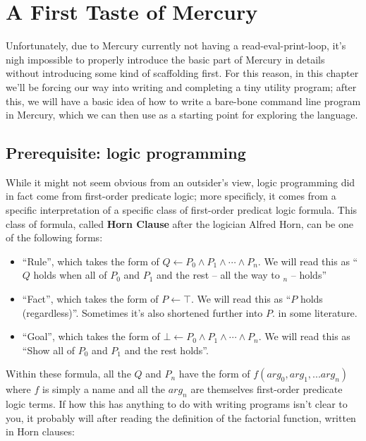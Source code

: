 \chapter{A First Taste of Mercury}

Unfortunately, due to Mercury currently not having a read-eval-print-loop, it's nigh impossible to properly introduce the basic part of Mercury in details without introducing some kind of scaffolding first. For this reason, in this chapter we'll be forcing our way into writing and completing a tiny utility program; after this, we will have a basic idea of how to write a bare-bone command line program in Mercury, which we can then use as a starting point for exploring the language.

\section{Prerequisite: logic programming}
\label{sec:org7970573}

While it might not seem obvious from an outsider's view, logic programming did in fact come from first-order predicate logic; more specificly, it comes from a specific interpretation of a specific class of first-order predicat logic formula. This class of formula, called \textbf{Horn Clause} after the logician Alfred Horn, can be one of the following forms:

\begin{itemize}
	\item ``Rule'', which takes the form of \(Q \leftarrow P_0 \wedge P_1 \wedge \cdots \wedge P_n\). We will read this as ``$Q$ holds when all of $P_0$ and $P_1$ and the rest -- all the way to $_n$ -- holds''
	\item ``Fact'', which takes the form of \(P \leftarrow \top\). We will read this as ``$P$ holds (regardless)''. Sometimes it's also shortened further into $P.$ in some literature.
	\item ``Goal'', which takes the form of \(\bot \leftarrow P_0 \wedge P_1 \wedge \cdots \wedge P_n\). We will read this as ``Show all of $P_0$ and $P_1$ and the rest holds''.
\end{itemize}

Within these formula, all the \(Q\) and \(P_n\) have the form of $f(arg_0, arg_1, ... arg_n)$ where $f$ is simply a name and all the $arg_n$ are themselves first-order predicate logic terms. If how this has anything to do with writing programs isn't clear to you, it probably will after reading the definition of the factorial function, written in Horn clauses:


